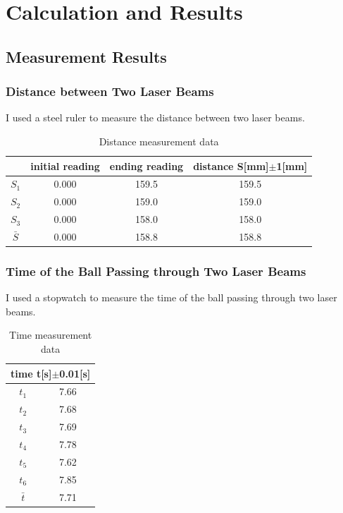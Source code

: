 \documentclass[12pt]{article}
\begin{document}
\section{Calculation and Results}
\subsection{Measurement Results}
\subsubsection{Distance between Two Laser Beams}
I used a steel ruler to measure the distance between two laser beams.  
\begin{table}[H]
\centering
\begin{tabular}{|c|c|c|c|}
\hline
  & initial reading & ending reading & distance S{[}mm{]}$\pm$1{[}mm{]} \\ \hline
$S_1$ & 0.000           & 159.5          & 159.5              \\ \hline
$S_2$ & 0.000           & 159.0          & 159.0              \\ \hline
$S_3$ & 0.000           & 158.0          & 158.0              \\ \hline
$\bar{S}$ & 0.000           & 158.8          & 158.8             \\ \hline
\end{tabular}
\caption{Distance measurement data}
\end{table}
\subsubsection{Time of the Ball Passing through Two Laser Beams}
I used a stopwatch to measure the time of the ball passing through two laser beams.
\begin{table}[H]
\centering
\begin{tabular}{|c|c|}
\hline
\multicolumn{2}{|c|}{time t{[}s{]}$\pm$0.01{[}s{]}} \\ \hline
$t_1$                    & 7.66                    \\ \hline
$t_2$                    & 7.68                    \\ \hline
$t_3$                    & 7.69                    \\ \hline
$t_4$                    & 7.78                    \\ \hline
$t_5$                    & 7.62                    \\ \hline
$t_6$                    & 7.85                    \\ \hline
$\bar{t}$                   & 7.71                    \\ \hline
\end{tabular}
\caption{Time measurement data}
\end{table}
\end{document}
